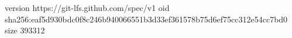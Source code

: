 version https://git-lfs.github.com/spec/v1
oid sha256:eaf5d930bdc0f8c246b940066551b3d33ef361578b75d6ef75cc312e54cc7bd0
size 393312
